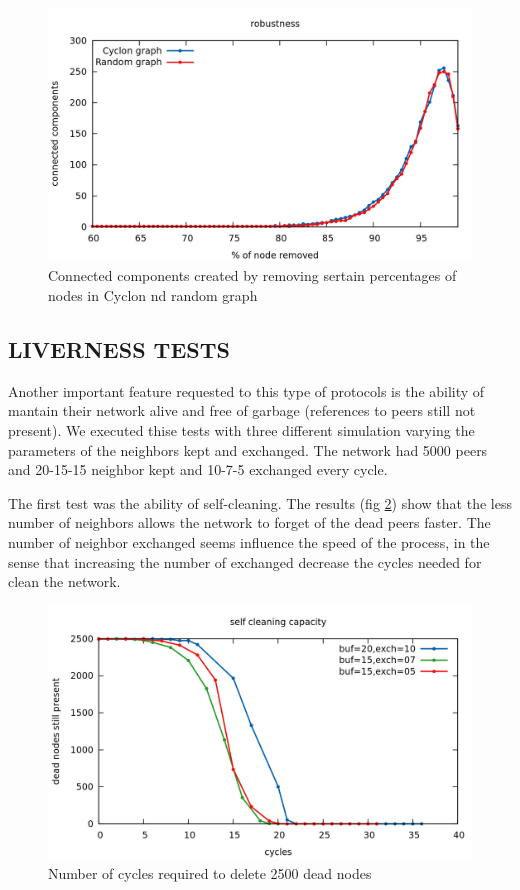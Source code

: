 \documentclass[a4paper,12pt,notitlepage]{article} %
\begin{document}
\begin{figure} [H]
	\centering
	\includegraphics[width=1\textwidth]{img/robustness}
	\caption{Connected components created by removing sertain percentages of nodes in Cyclon nd random graph}
	\label{robust}
\end{figure}

 \subsection{LIVERNESS TESTS}

Another important feature requested to this type of protocols is the ability of mantain their network
 alive and free of garbage (references to peers still not present). We executed thise tests with three different 
 simulation varying the parameters of the neighbors kept and exchanged. The network had 5000 peers and
 20-15-15 neighbor kept and 10-7-5 exchanged every cycle.

The first test was the ability of self-cleaning. The results (fig \ref{sc}) show that the less number of neighbors
 allows the network to forget of the dead peers faster. The number of neighbor exchanged seems influence
 the speed of the process, in the sense that increasing the number of exchanged decrease the cycles needed
 for clean the network.

\begin{figure} [H]
	\centering
	\includegraphics[width=1\textwidth]{img/self_cleanin}
	\caption{Number of cycles required to delete 2500 dead nodes}
	\label{sc}
\end{figure}
\end{document}
